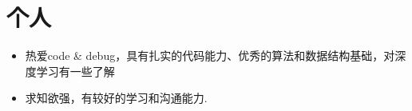 \documentclass[letterpaper,11pt]{article}
\newcommand{\resumeSubHeadingListStart}{\begin{itemize}[leftmargin=*]}
\newcommand{\resumeSubHeadingListEnd}{\end{itemize}}
\begin{document}
\vspace{-10pt}
\section{个人}
 \resumeSubHeadingListStart
   \item{
     {热爱code \& debug，具有扎实的代码能力、优秀的算法和数据结构基础，对深度学习有一些了解}
   }
   \item{
    求知欲强，有较好的学习和沟通能力.
   }   
 \resumeSubHeadingListEnd


\end{document}

